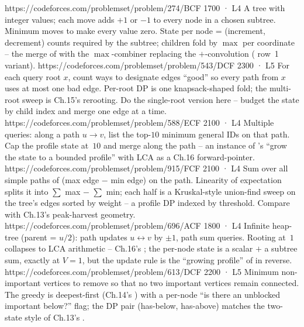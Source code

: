 \begin{mixedset}
    {https://codeforces.com/problemset/problem/274/B}{CF 1700 · L4}
    {A tree with integer values; each move adds $+1$ or $-1$ to every node in a chosen subtree. Minimum moves to make every value zero. State per node = (increment, decrement) counts required by the subtree; children fold by $\max$ per coordinate -- the merge of  with the $\max$-combiner replacing the $+$-convolution ( row~1 variant).}
    {https://codeforces.com/problemset/problem/543/D}{CF 2300 · L5}
    {For each query root $x$, count ways to designate edges ``good'' so every path from $x$ uses at most one bad edge. Per-root DP is one knapsack-shaped fold; the multi-root sweep is Ch.15's rerooting. Do the single-root version here -- budget the state by child index and merge one edge at a time.}
    {https://codeforces.com/problemset/problem/588/E}{CF 2100 · L4}
    {Multiple queries: along a path $u \to v$, list the top-$10$ minimum general IDs on that path. Cap the profile state at~$10$ and merge along the path -- an instance of 's ``grow the state to a bounded profile'' with LCA as a Ch.16 forward-pointer.}
    {https://codeforces.com/problemset/problem/915/F}{CF 2100 · L4}
    {Sum over all simple paths of (max edge $-$ min edge) on the path. Linearity of expectation splits it into $\sum$ max $-$ $\sum$ min; each half is a Kruskal-style union-find sweep on the tree's edges sorted by weight -- a profile DP indexed by threshold. Compare with Ch.13's peak-harvest geometry.}
    {https://codeforces.com/problemset/problem/696/A}{CF 1800 · L4}
    {Infinite heap-tree (parent = $u/2$): path updates $u \leftrightarrow v$ by $\pm 1$, path sum queries. Rooting at~$1$ collapses to LCA arithmetic -- Ch.16's ; the per-node state is a scalar $+$ a subtree sum, exactly  at $V=1$, but the update rule is the ``growing profile'' of  in reverse.}
    {https://codeforces.com/problemset/problem/613/D}{CF 2200 · L5}
    {Minimum non-important vertices to remove so that no two important vertices remain connected. The greedy is deepest-first (Ch.14's ) with a per-node ``is there an unblocked important below?'' flag; the DP pair (has-below, has-above) matches the two-state style of Ch.13's .}

\end{mixedset}
